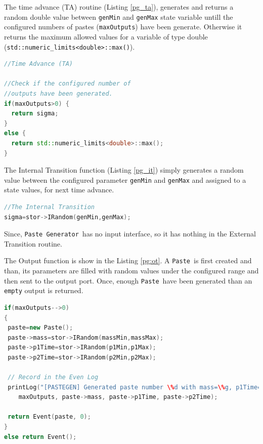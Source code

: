 \documentclass[titlepage]{article}%
\newcommand{\pgen}{\texttt{Paste Generator}~}
\newcommand{\paste}{\texttt{Paste}~}
\begin{document}
{The time advance (TA) routine (Listing \ref{pg_ta}), generates and returns a random double value between \texttt{genMin} and \texttt{genMax} state variable untill the configured numbers of pastes (\texttt{maxOutputs}) have been generate. Otherwise it returns the maximum allowed values for a variable of type double (\texttt{std::numeric\_limits<double>::max()}).

\begin{lstlisting}[caption={The TA (Time Advance) function}, language=c++, label={pg_ta}]
//Time Advance (TA)

//Check if the configured number of
//outputs have been generated.
if(maxOutputs>0) {
  return sigma;
}
else {
  return std::numeric_limits<double>::max();
}
\end{lstlisting}	

The Internal Transition function (Listing \ref{pg_it}) simply generates a random value between the configured parameter \texttt{genMin} and \texttt{genMax} and assigned to a state values, for next time advance.

\begin{lstlisting}[caption={The Internal Transition function for the \pgen}, language=c++, label={pg_it}]
//The Internal Transition
sigma=stor->IRandom(genMin,genMax);
\end{lstlisting}

Since, \pgen has no input interface, so it has nothing in the External Transition routine.

The Output function is show in the Listing \ref{pg:ot}. A \paste is first created and than, its parameters are filled with random values under the configured range and then sent to the output port. Once, enough \paste have been generated than an \texttt{empty} output is returned.
 
\begin{lstlisting}[caption={The Output function for the \pgen}, language=c++, label={pg:ot}]
if(maxOutputs-->0)
{
 paste=new Paste();
 paste->mass=stor->IRandom(massMin,massMax);
 paste->p1Time=stor->IRandom(p1Min,p1Max);
 paste->p2Time=stor->IRandom(p2Min,p2Max);

 // Record in the Even Log
 printLog("[PASTEGEN] Generated paste number \%d with mass=\%g, p1Time=\%g, p2Time=\%g\n",
	maxOutputs, paste->mass, paste->p1Time, paste->p2Time);

 return Event(paste, 0);
}
else return Event();

\end{lstlisting}


}
\end{document}
